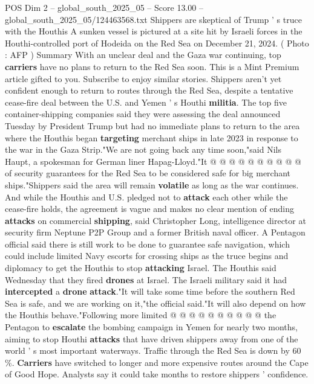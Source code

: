 \begin{textsample}{POS Dim 2 – global\_south\_2025\_05 – Score 13.00 – global\_south\_2025\_05/124463568.txt}  \label{ex:f2_pos_298}
Shippers are skeptical of Trump ' s truce with the Houthis A sunken vessel is pictured at a site hit by Israeli forces in the Houthi-controlled port of Hodeida on the Red Sea on December 21, 2024. ( Photo : AFP ) Summary With an unclear deal and the Gaza war continuing, top \textbf{carriers} have no plans to return to the Red Sea soon.
This is a Mint Premium article gifted to you.
Subscribe to enjoy similar stories.
Shippers aren't yet confident enough to return to routes through the Red Sea, despite a tentative cease-fire deal between the U.S. and Yemen ' s Houthi \textbf{militia}.
The top five container-shipping companies said they were assessing the deal announced Tuesday by President Trump but had no immediate plans to return to the area where the Houthis began \textbf{targeting} merchant ships in late 2023 in response to the war in the Gaza Strip."We are not going back any time soon,"said Nils Haupt, a spokesman for German liner Hapag-Lloyd."It @ @ @ @ @ @ @ @ @ @ of security guarantees for the Red Sea to be considered safe for big merchant ships."Shippers said the area will remain \textbf{volatile} as long as the war continues.
And while the Houthis and U.S. pledged not to \textbf{attack} each other while the cease-fire holds, the agreement is vague and makes no clear mention of ending \textbf{attacks} on commercial \textbf{shipping}, said Christopher Long, intelligence director at security firm Neptune P2P Group and a former British naval officer.
A Pentagon official said there is still work to be done to guarantee safe navigation, which could include limited Navy escorts for crossing ships as the truce begins and diplomacy to get the Houthis to stop \textbf{attacking} Israel.
The Houthis said Wednesday that they fired \textbf{drones} at Israel.
The Israeli military said it had \textbf{intercepted} a \textbf{drone} \textbf{attack}."It will take some time before the southern Red Sea is safe, and we are working on it,"the official said."It will also depend on how the Houthis behave."Following more limited @ @ @ @ @ @ @ @ @ @ the Pentagon to \textbf{escalate} the bombing campaign in Yemen for nearly two months, aiming to stop Houthi \textbf{attacks} that have driven shippers away from one of the world ' s most important waterways.
Traffic through the Red Sea is down by 60 \%. \textbf{Carriers} have switched to longer and more expensive routes around the Cape of Good Hope.
Analysts say it could take months to restore shippers ' confidence.

\end{textsample}
